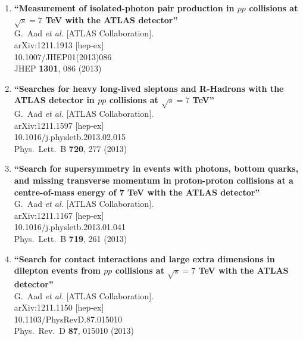 \documentclass{article}
\begin{document}
\begin{enumerate}
\item%
{\bf ``Measurement of isolated-photon pair production in $pp$ collisions at $\sqrt{s}=7$ TeV with the ATLAS detector''}
  \\{}G.~Aad {\it et al.}  [ATLAS Collaboration].
  \\{}arXiv:1211.1913 [hep-ex]
    \\{}10.1007/JHEP01(2013)086
\\{}JHEP {\bf 1301}, 086 (2013) %


\item%
{\bf ``Searches for heavy long-lived sleptons and R-Hadrons with the ATLAS detector in $pp$ collisions at $\sqrt{s}=7$ TeV''}
  \\{}G.~Aad {\it et al.}  [ATLAS Collaboration].
  \\{}arXiv:1211.1597 [hep-ex]
    \\{}10.1016/j.physletb.2013.02.015
\\{}Phys.\ Lett.\ B {\bf 720}, 277 (2013) %


\item%
{\bf ``Search for supersymmetry in events with photons, bottom quarks, and missing transverse momentum in proton-proton collisions at a centre-of-mass energy of 7 TeV with the ATLAS detector''}
  \\{}G.~Aad {\it et al.}  [ATLAS Collaboration].
  \\{}arXiv:1211.1167 [hep-ex]
    \\{}10.1016/j.physletb.2013.01.041
\\{}Phys.\ Lett.\ B {\bf 719}, 261 (2013) %


\item%
{\bf ``Search for contact interactions and large extra dimensions in dilepton events from $pp$ collisions at $\sqrt{s}=7$ TeV with the ATLAS detector''}
  \\{}G.~Aad {\it et al.}  [ATLAS Collaboration].
  \\{}arXiv:1211.1150 [hep-ex]
    \\{}10.1103/PhysRevD.87.015010
\\{}Phys.\ Rev.\ D {\bf 87}, 015010 (2013) %



\end{enumerate}
\end{document}

